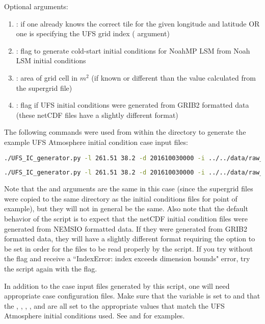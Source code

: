 Optional arguments:
\begin{enumerate}
\item {}: if one already knows the correct tile for the given longitude and latitude OR one is specifying the UFS grid index ( argument)
\item {}: flag to generate cold-start initial conditions for NoahMP LSM from Noah LSM initial conditions
\item {}: area of grid cell in $m^2$ (if known or different than the value calculated from the supergrid file)
\item {}: flag if UFS initial conditions were generated from GRIB2 formatted data (these netCDF files have a slightly different format)
\end{enumerate}

The following commands were used from within the  directory to generate the example UFS Atmosphere initial condition case input files:
\begin{lstlisting}[language=bash]
./UFS_IC_generator.py -l 261.51 38.2 -d 201610030000 -i ../../data/raw_case_input/FV3_C96_example_ICs -g ../../data/raw_case_input/FV3_C96_example_ICs -n fv3_model_point_noah
\end{lstlisting}

\begin{lstlisting}[language=bash]
./UFS_IC_generator.py -l 261.51 38.2 -d 201610030000 -i ../../data/raw_case_input/FV3_C96_example_ICs -g ../../data/raw_case_input/FV3_C96_example_ICs -n fv3_model_point_noahmp -mp
\end{lstlisting}

Note that the  and  arguments are the same in this case (since the supergrid files were copied to the same directory as the initial conditions files for point of example), but they will not in general be the same. Also note that the default behavior of the script is to expect that the netCDF initial condition files were generated from NEMSIO formatted data. If they were generated from GRIB2 formatted data, they will have a slightly different format requiring the  option to be set in order for the files to be read properly by the script. If you try without the  flag and receive a ``IndexError: index exceeds dimension bounds" error, try the script again with the flag.

In addition to the case input files generated by this script, one will need appropriate case configuration files. Make sure that the  variable is set to  and that the , , , , and  are all set to the appropriate values that match the UFS Atmosphere initial conditions used. See  and  for examples.

